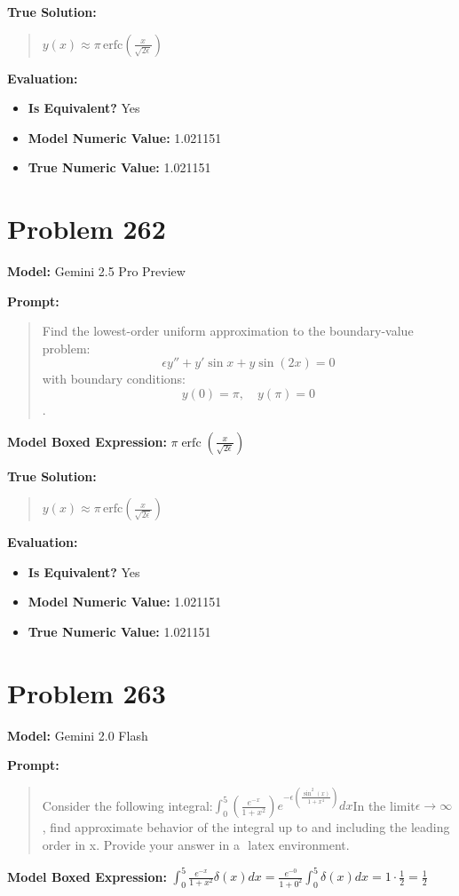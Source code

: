 \documentclass{article}
\begin{document}
{\textbf{True Solution:}
\begin{quote}
$y(x) \approx \pi \, \text{erfc}\left(\frac{x}{\sqrt{2\epsilon}}\right)$
\end{quote}

\textbf{Evaluation:}
\begin{itemize}
\item \textbf{Is Equivalent?} Yes
\item \textbf{Model Numeric Value:} 1.021151
\item \textbf{True Numeric Value:} 1.021151
\end{itemize}
\vspace{1cm}
\section*{Problem 262}
\textbf{Model:} Gemini 2.5 Pro Preview

\textbf{Prompt:}
\begin{quote}
Find the lowest-order uniform approximation to the boundary-value problem: $$ \epsilon y'' + y' \sin x + y \sin(2x) = 0 $$ with boundary conditions:$$ y(0) = \pi, \quad y(\pi) = 0 $$.
\end{quote}
\textbf{Model Boxed Expression:} $\pi \operatorname{erfc}\left(\frac{x}{\sqrt{2\epsilon}}\right)$

\textbf{True Solution:}
\begin{quote}
$y(x) \approx \pi \, \text{erfc}\left(\frac{x}{\sqrt{2\epsilon}}\right)$
\end{quote}

\textbf{Evaluation:}
\begin{itemize}
\item \textbf{Is Equivalent?} Yes
\item \textbf{Model Numeric Value:} 1.021151
\item \textbf{True Numeric Value:} 1.021151
\end{itemize}
\vspace{1cm}
\section*{Problem 263}
\textbf{Model:} Gemini 2.0 Flash

\textbf{Prompt:}
\begin{quote}
Consider the following integral:$\int_0^{5} ( \frac{e^{-x}}{1 + x^2}) e^{-\epsilon (\frac{\sin^2(x)}{1 + x^4})} dx$In the limit$\epsilon \rightarrow \infty$, find approximate behavior of the integral up to and including the leading order in x. Provide your answer in a $\boxed{}$ latex environment.
\end{quote}
\textbf{Model Boxed Expression:} $\int_0^{5} \frac{e^{-x}}{1 + x^2} \delta(x) dx = \frac{e^{-0}}{1 + 0^2} \int_0^{5} \delta(x) dx = 1 \cdot \frac{1}{2} = \frac{1}{2}$

}
\end{document}
